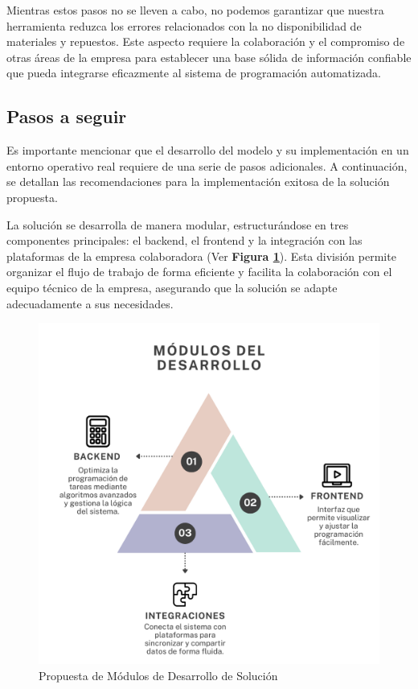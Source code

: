 \documentclass{article}
\begin{document}
Mientras estos pasos no se lleven a cabo, no podemos garantizar que nuestra herramienta reduzca los errores relacionados con la no disponibilidad de materiales y repuestos. Este aspecto requiere la colaboración y el compromiso de otras áreas de la empresa para establecer una base sólida de información confiable que pueda integrarse eficazmente al sistema de programación automatizada.

\subsection{Pasos a seguir}

Es importante mencionar que el desarrollo del modelo y su implementación en un entorno operativo real requiere de una serie de pasos adicionales. A continuación, se detallan las recomendaciones para la implementación exitosa de la solución propuesta.

La solución se desarrolla de manera modular, estructurándose en tres componentes principales: el backend, el frontend y la integración con las plataformas de la empresa colaboradora (Ver \textbf{Figura \ref{fig:modulos-desarrollo}}). Esta división permite organizar el flujo de trabajo de forma eficiente y facilita la colaboración con el equipo técnico de la empresa, asegurando que la solución se adapte adecuadamente a sus necesidades.

\begin{figure}[htbp]
  \centering
  \includegraphics[scale=0.3]{imgs/ModulosDesarrollo.png}
  \caption{Propuesta de Módulos de Desarrollo de Solución}
  \label{fig:modulos-desarrollo}
\end{figure}
\end{document}
